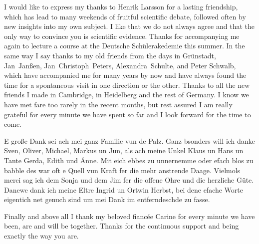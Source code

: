 I would like to express my thanks to Henrik Larsson
for a lasting friendship,
which has lead to many weekends of fruitful
scientific debate,
followed often by new insights into my own subject.
I like that we do not always agree
and that the only way to convince you is scientific evidence.
Thanks for accompanying me again
to lecture a course at the Deutsche Schülerakedemie this summer.
In the same way I say thanks to my old friends
from the days in Grünstadt,
Jan~Janßen,
Jan~Christoph~Peters,
Alexandra~Schulte,
and
Peter Schwalb,
which have accompanied me for many years by now
and have always found the time for a spontaneous visit
in one direction or the other.
Thanks to all the new friends I made in Cambridge,
in Heidelberg and the rest of Germany.
I know we have met fare too rarely in the recent months,
but rest assured I am really
grateful for every minute we have spent so far
and I look forward for the time to come.


E große Dank sei ach
mei ganz Familie vun de Palz.
Ganz bsonders will ich danke Sven, Oliver,
Michael, Markus un Jun,
als ach meine Unkel Klaus un Hans
un Tante Gerda, Edith und Änne.
Mit eich ebbes zu unnernemme oder efach blos zu babble
des war oft e Quell vun Kraft fer die mehr anstrende Daage.
Vielmols merci sag ich dem Sonja und dem Jim
fer die offene Ohre und die herzliche Güte.
Danewe dank ich meine Eltre Ingrid un Ortwin Herbst,
bei dene efache Worte eigentich net genuch sind
um mei Dank im entferndeschde zu fasse.


Finally and above all I thank my beloved fianc\'ee Carine
for every minute we have been, are and will be together.
Thanks for the continuous support and being exactly the way you are.
